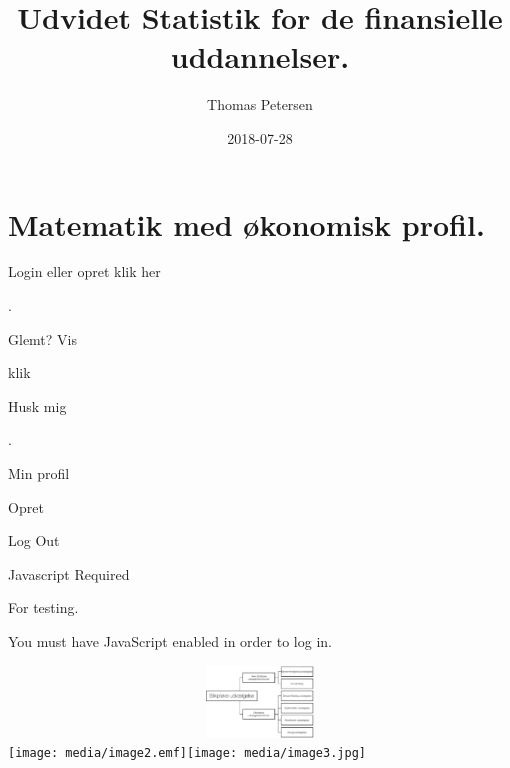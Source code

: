 \documentclass[]{book}
\title{Udvidet Statistik for de finansielle uddannelser.}
\author{Thomas Petersen}
\date{2018-07-28}
\begin{document}
\maketitle

{
\setcounter{tocdepth}{1}
\tableofcontents
}
\hypertarget{matematik-med-konomisk-profil.}{%
\chapter*{Matematik med økonomisk
profil.}\label{matematik-med-konomisk-profil.}}

\hypertarget{Settings}{}

\hypertarget{TopBar}{}
\hypertarget{Sentry_label}{}
\protect\hypertarget{Sentry_label_span}{}{Login eller opret klik her}

\hypertarget{magicGroup}{}
\hypertarget{messages}{}
.

\hypertarget{Sentry_emailDiv}{}
{ }

\hypertarget{Sentry_passwordDiv}{}
{ }

\hypertarget{Sentry_HIDpasswordDiv}{}
{ }

\hypertarget{unHideDiv}{}
\protect\hypertarget{forgotSpan}{}{Glemt?}
\protect\hypertarget{unHideSpan}{}{Vis}

\hypertarget{buttonDiv}{}
klik

\hypertarget{psistDiv}{}
 \protect\hypertarget{psistSpan}{}{Husk mig}

\hypertarget{goInside}{}
\protect\hypertarget{goInsideSpan}{}{.}

\hypertarget{myProfile}{}
Min profil

\hypertarget{Tilmeld}{}
Opret

\hypertarget{logOut}{}
{Log Out}

\hypertarget{xbox}{}

\hypertarget{Sentry_noJSLogin}{}
{Javascript Required}

\hypertarget{Sentry_loggingIn}{}

\hypertarget{Sentry_In}{}
For testing.

You must have JavaScript enabled in order to log in.

\includegraphics[width=6.37083in,height=0.75278in]{media/image1.png}\texttt{[image: media/image2.emf]}\texttt{[image: media/image3.jpg]}
\end{document}
